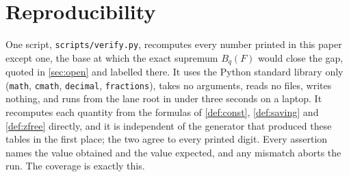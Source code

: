 \documentclass[11pt]{amsart}
\theoremstyle{definition}
\theoremstyle{remark}
\begin{document}
\section{Reproducibility}
\label{sec:repro}

One script, \texttt{scripts/verify.py}, recomputes every number printed in this paper except one, the base at which the exact supremum $B_q(F)$ would close the gap, quoted in \cref{sec:open} and labelled there. It uses the Python standard library only (\texttt{math}, \texttt{cmath}, \texttt{decimal}, \texttt{fractions}), takes no arguments, reads no files, writes nothing, and runs from the lane root in under three seconds on a laptop. It recomputes each quantity from the formulas of \cref{def:const}, \cref{def:saving} and \cref{def:zfree} directly, and it is independent of the generator \cite{numerology} that produced these tables in the first place; the two agree to every printed digit. Every assertion names the value obtained and the value expected, and any mismatch aborts the run. The coverage is exactly this.
\end{document}
